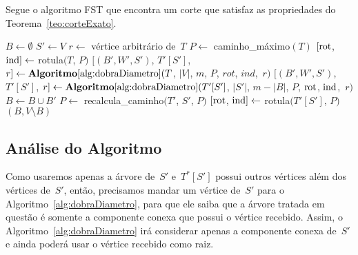 		Segue o algoritmo FST que encontra um corte que satisfaz as 
		propriedades do Teorema~\ref{teo:corteExato}.
		
		\bigskip

		\begin{algorithm}[H]
		\label{alg:corteExato}

			\caption{}
			$B\gets \emptyset$\;
			$S'\gets V$\;
			$r\gets$ vértice arbitrário de~$T$\;
			$P\gets$ {\sc caminho\_máximo}$(T)$\;
			$[\mathrm{rot}$, $\mathrm{ind}]\gets$ {\sc rotula}$(T$, $P)$\;
			$[(B',W',S')$, $T'[S']$, $r]\gets
				\mathbf {Algoritmo\ref{alg:dobraDiametro}}(T$,
				$|V|$, $m$, $P$, $rot$, $ind$,~$r)$\;
			{
				$[(B',W',S')$, $T'[S']$, $r]\gets
					\mathbf {Algoritmo\ref{alg:dobraDiametro}}(T'[S']$,
					$|S'|$, $m-|B|$, $P$, $\mathrm{rot}$, $\mathrm{ind}$,~$r)$\;
				$B\gets B\cup B'$\;
				$P\gets$ {\sc recalcula\_caminho}$(T'$, $S'$, $P)$\;
				$[\mathrm{rot}$, $\mathrm{ind}]\gets$ {\sc rotula}$(T'[S']$, $P)$
			}
			\Return $(B,V\setminus B)$\;

		\end{algorithm}	

		\bigskip

		\subsection*{Análise do Algoritmo}


		

		Como usaremos apenas a árvore de~$S'$ e~$T^*[S']$ possui outros 
		vértices além dos vértices de~$S'$,
		então, precisamos mandar um vértice de~$S'$ para
		o Algoritmo~\ref{alg:dobraDiametro},
		para que ele saiba que a árvore tratada em questão é
		somente a componente conexa que possui o vértice recebido.
		Assim, o Algoritmo~\ref{alg:dobraDiametro} irá considerar
		apenas a componente conexa de~$S'$ e ainda
		poderá usar o vértice recebido como raiz.

